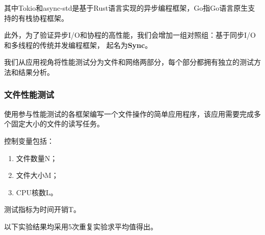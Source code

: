 \documentclass[supercite]{HustGraduPaper}
\theoremstyle{definition}
\begin{document}
其中Tokio和async-std是基于Rust语言实现的异步编程框架，Go指Go语言原生支持的有栈协程框架。\par

此外，为了验证异步I/O和协程的高性能，我们会增加一组对照组：基于同步I/O和多线程的传统并发编程框架，
起名为\textbf{Sync}。\par

我们从应用视角将性能测试分为文件和网络两部分，每个部分都拥有独立的测试方法和结果分析。\par

\subsubsection{文件性能测试}


使用参与性能测试的各框架编写一个文件操作的简单应用程序，该应用需要完成多个固定大小的文件的读写任务。\par

控制变量包括：

\begin{enumerate}
  \item 文件数量N；
  \item 文件大小M；
  \item CPU核数L。
\end{enumerate}

测试指标为时间开销T。\par

以下实验结果均采用5次重复实验求平均值得出。\par
\end{document}
